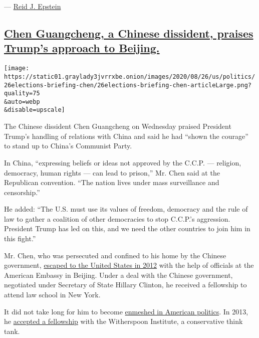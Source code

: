 --- \href{https://www.nytimes3xbfgragh.onion/by/reid-j-epstein}{Reid J.
Epstein}

\hypertarget{chen-guangcheng-a-chinese-dissident-praises-trumps-approach-to-beijing}{%
\subsection{\texorpdfstring{\protect\hyperlink{chen-guangcheng-a-chinese-dissident-praises-trumps-approach-to-beijing}{Chen
Guangcheng, a Chinese dissident, praises Trump's approach to
Beijing.}}{Chen Guangcheng, a Chinese dissident, praises Trump's approach to Beijing.}}\label{chen-guangcheng-a-chinese-dissident-praises-trumps-approach-to-beijing}}

\texttt{[image: https://static01.graylady3jvrrxbe.onion/images/2020/08/26/us/politics/26elections-briefing-chen/26elections-briefing-chen-articleLarge.png?quality=75\\\&auto=webp\\\&disable=upscale]}

The Chinese dissident Chen Guangcheng on Wednesday praised President
Trump's handling of relations with China and said he had ``shown the
courage'' to stand up to China's Communist Party.

In China, ``expressing beliefs or ideas not approved by the C.C.P. ---
religion, democracy, human rights --- can lead to prison,'' Mr. Chen
said at the Republican convention. ``The nation lives under mass
surveillance and censorship.''

He added: ``The U.S. must use its values of freedom, democracy and the
rule of law to gather a coalition of other democracies to stop C.C.P.'s
aggression. President Trump has led on this, and we need the other
countries to join him in this fight.''

Mr. Chen, who was persecuted and confined to his home by the Chinese
government,
\href{https://www.nytimes3xbfgragh.onion/2012/05/20/world/asia/china-dissident-chen-guangcheng-united-states.html}{escaped
to the United States in 2012} with the help of officials at the American
Embassy in Beijing. Under a deal with the Chinese government, negotiated
under Secretary of State Hillary Clinton, he received a fellowship to
attend law school in New York.

It did not take long for him to become
\href{https://www.nytimes3xbfgragh.onion/2013/07/11/world/asia/after-epic-escape-from-china-exile-is-mired-in-partisan-us.html}{enmeshed
in American politics}. In 2013, he
\href{https://www.nytimes3xbfgragh.onion/2013/10/03/world/americas/chinese-activist-joins-conservative-research-group.html}{accepted
a fellowship} with the Witherspoon Institute, a conservative think tank.

